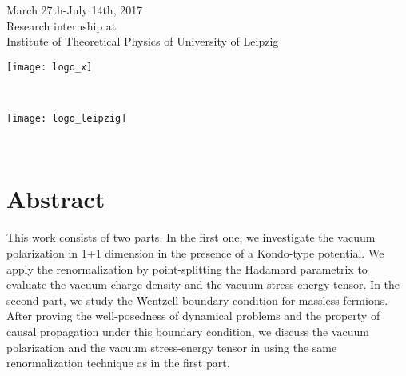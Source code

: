 \begin{titlepage}


{\large March 27th-July 14th, 2017 \\Research internship at \\ Institute of Theoretical Physics of University of Leipzig}\\[1cm] %


\begin{minipage}{0.4\textwidth}
\begin{flushleft} \large
\texttt{[image: logo\_x]}\\[1cm] %
  
\end{flushleft}
\end{minipage}\\[1cm]
\begin{minipage}{0.4\textwidth}
\begin{flushright} \large
\texttt{[image: logo\_leipzig]}\\[1cm] %
  
\end{flushright}
\end{minipage}\\[1cm]

\vfill %

\end{titlepage}


\section*{Abstract}
This work consists of two parts.
In the first one, we investigate the vacuum polarization in 1+1 dimension in the presence of a Kondo-type potential.
We apply the renormalization by point-splitting \wrt the  Hadamard parametrix to evaluate the vacuum charge density and the vacuum stress-energy tensor.
In the second part, we study the Wentzell boundary condition for massless fermions.
After proving the well-posedness of dynamical problems and the property of causal propagation under this boundary condition, we discuss the vacuum polarization and the vacuum stress-energy tensor in using the same renormalization technique as in the first part.

